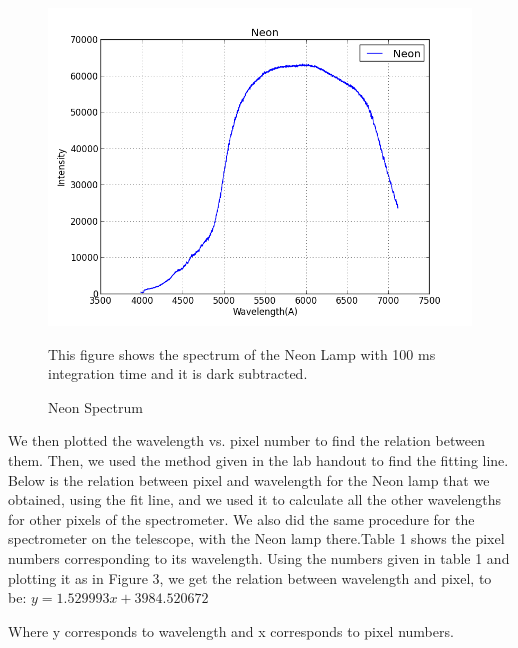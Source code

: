 \documentclass[letterpaper,12pt]{article}
\begin{document}
\FloatBarrier
\begin{figure}
\centering
\includegraphics[scale=0.5]{neon_wavelength.png}
\caption{Neon Spectrum}
This figure shows the spectrum of the Neon Lamp with 100 ms integration time and it is dark subtracted.
\end{figure}
\FloatBarrier


We then plotted the wavelength vs. pixel number to find the relation between them. Then, we used the method given in the lab handout to find the fitting line. Below is the relation between pixel and wavelength for the Neon lamp that we obtained, using the fit line, and we used it to calculate all the other wavelengths for other pixels of the spectrometer. We also did the same procedure for the spectrometer on the telescope, with the Neon lamp there.Table 1 shows the pixel numbers corresponding to its wavelength. Using the numbers given in table 1 and plotting it as in Figure 3, we get the relation between wavelength and pixel, to be:
\newline
\begin{math}
y=1.529993 x + 3984.520672
\end{math}


Where y corresponds to wavelength and x corresponds to pixel numbers.
\end{document}
